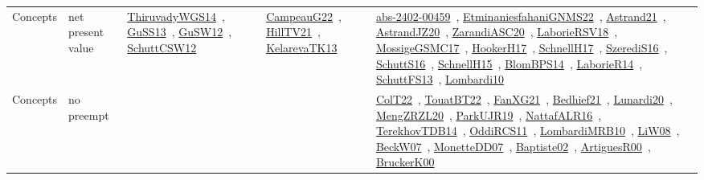 {\begin{longtable}{lp{3cm}>{\raggedright\arraybackslash}p{6cm}>{\raggedright\arraybackslash}p{6cm}>{\raggedright\arraybackslash}p{8cm}}
\index{net present value}\index{Concepts!net present value}Concepts & net present value & \href{../works/ThiruvadyWGS14.pdf}{ThiruvadyWGS14}~\cite{ThiruvadyWGS14}, \href{../works/GuSS13.pdf}{GuSS13}~\cite{GuSS13}, \href{../works/GuSW12.pdf}{GuSW12}~\cite{GuSW12}, \href{../works/SchuttCSW12.pdf}{SchuttCSW12}~\cite{SchuttCSW12} & \href{../works/CampeauG22.pdf}{CampeauG22}~\cite{CampeauG22}, \href{../works/HillTV21.pdf}{HillTV21}~\cite{HillTV21}, \href{../works/KelarevaTK13.pdf}{KelarevaTK13}~\cite{KelarevaTK13} & \href{../works/abs-2402-00459.pdf}{abs-2402-00459}~\cite{abs-2402-00459}, \href{../works/EtminaniesfahaniGNMS22.pdf}{EtminaniesfahaniGNMS22}~\cite{EtminaniesfahaniGNMS22}, \href{../works/Astrand21.pdf}{Astrand21}~\cite{Astrand21}, \href{../works/AstrandJZ20.pdf}{AstrandJZ20}~\cite{AstrandJZ20}, \href{../works/ZarandiASC20.pdf}{ZarandiASC20}~\cite{ZarandiASC20}, \href{../works/LaborieRSV18.pdf}{LaborieRSV18}~\cite{LaborieRSV18}, \href{../works/MossigeGSMC17.pdf}{MossigeGSMC17}~\cite{MossigeGSMC17}, \href{../works/HookerH17.pdf}{HookerH17}~\cite{HookerH17}, \href{../works/SchnellH17.pdf}{SchnellH17}~\cite{SchnellH17}, \href{../works/SzerediS16.pdf}{SzerediS16}~\cite{SzerediS16}, \href{../works/SchuttS16.pdf}{SchuttS16}~\cite{SchuttS16}, \href{../works/SchnellH15.pdf}{SchnellH15}~\cite{SchnellH15}, \href{../works/BlomBPS14.pdf}{BlomBPS14}~\cite{BlomBPS14}, \href{../works/LaborieR14.pdf}{LaborieR14}~\cite{LaborieR14}, \href{../works/SchuttFS13.pdf}{SchuttFS13}~\cite{SchuttFS13}, \href{../works/Lombardi10.pdf}{Lombardi10}~\cite{Lombardi10}\\
\index{no preempt}\index{Concepts!no preempt}Concepts & no preempt &  &  & \href{../works/ColT22.pdf}{ColT22}~\cite{ColT22}, \href{../works/TouatBT22.pdf}{TouatBT22}~\cite{TouatBT22}, \href{../works/FanXG21.pdf}{FanXG21}~\cite{FanXG21}, \href{../works/Bedhief21.pdf}{Bedhief21}~\cite{Bedhief21}, \href{../works/Lunardi20.pdf}{Lunardi20}~\cite{Lunardi20}, \href{../works/MengZRZL20.pdf}{MengZRZL20}~\cite{MengZRZL20}, \href{../works/ParkUJR19.pdf}{ParkUJR19}~\cite{ParkUJR19}, \href{../works/NattafALR16.pdf}{NattafALR16}~\cite{NattafALR16}, \href{../works/TerekhovTDB14.pdf}{TerekhovTDB14}~\cite{TerekhovTDB14}, \href{../works/OddiRCS11.pdf}{OddiRCS11}~\cite{OddiRCS11}, \href{../works/LombardiMRB10.pdf}{LombardiMRB10}~\cite{LombardiMRB10}, \href{../works/LiW08.pdf}{LiW08}~\cite{LiW08}, \href{../works/BeckW07.pdf}{BeckW07}~\cite{BeckW07}, \href{../works/MonetteDD07.pdf}{MonetteDD07}~\cite{MonetteDD07}, \href{../works/Baptiste02.pdf}{Baptiste02}~\cite{Baptiste02}, \href{../works/ArtiguesR00.pdf}{ArtiguesR00}~\cite{ArtiguesR00}, \href{../works/BruckerK00.pdf}{BruckerK00}~\cite{BruckerK00}\\

\end{longtable}}
